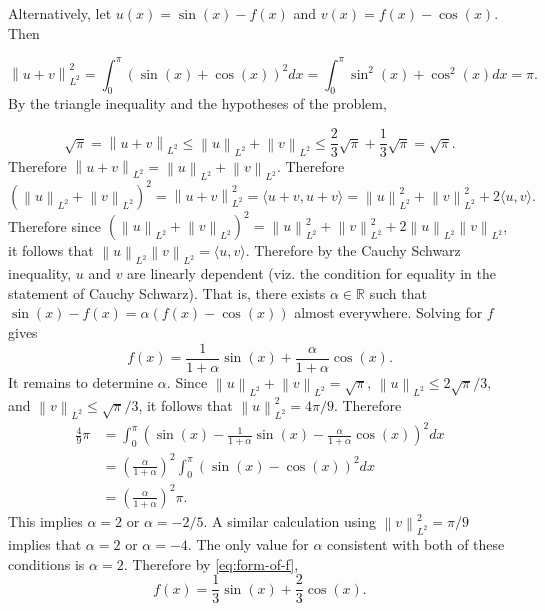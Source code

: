 \documentclass[answers]{exam}
\theoremstyle{problemstyle}
\newcommand{\norm}[1]{\left\lVert#1\right\rVert} %
\newcommand{\1}[1]{\textbf{1}_{\left[#1\right]}} %
\def\R{\mathbb{R}} %
\begin{document}
\begin{questions}
\begin{solution}
    Alternatively, let $u(x)= \sin(x)-f(x)$ and $v(x)=f(x)-\cos(x)$. Then

\begin{equation*}
  \norm{u+v}_{L^{2}}^{2} = \int_{0}^{\pi}\left( \sin(x)+\cos(x) \right)^{2}dx = \int_{0}^{\pi} \sin^{2}(x)+ \cos^{2}(x)dx =\pi.
\end{equation*}
By the triangle inequality and the hypotheses of the problem,

\begin{equation*}
  \sqrt{\pi}=\norm{u+v}_{L^{2}} \leq \norm{u}_{L^{2}} + \norm{v}_{L^{2}} \leq \frac{2}{3}\sqrt{\pi}+ \frac{1}{3}\sqrt{\pi}=\sqrt{\pi}.
\end{equation*}
Therefore
$\norm{u+v}_{L^{2}} = \norm{u}_{L^{2}} + \norm{v}_{L^{2}}$. Therefore
\begin{equation*}
  \left( \norm{u}_{L^{2}}+ \norm{v}_{L^{2}} \right)^{2} = \norm{u+v}_{L^{2}}^{2} = \langle u+v, u+v\rangle = \norm{u}^{2}_{L^{2}}+\norm{v}^{2}_{L^{2}} + 2\langle u,v\rangle.
\end{equation*}
Therefore since $  \left( \norm{u}_{L^{2}}+ \norm{v}_{L^{2}} \right)^{2}= \norm{u}_{L^{2}}^{2}+\norm{v}_{L^{2}}^{2}+2 \norm{u}_{L^{2}}\norm{v}_{L^{2}}$, it follows that $\norm{u}_{L^{2}}\norm{v}_{L^{2}}= \langle u, v \rangle$. Therefore by the Cauchy Schwarz inequality, $u$ and $v$ are linearly dependent (viz. the condition for equality in the statement of Cauchy Schwarz). That is, there exists $\alpha\in \R$ such that $\sin(x)-f(x)= \alpha \left( f(x)-\cos(x) \right)$ almost everywhere. Solving for $f$ gives
\begin{equation}\label{eq:form-of-f}
  f(x) = \frac{1}{1+\alpha}\sin(x)+ \frac{\alpha}{1+\alpha}\cos(x).
\end{equation}
It remains to determine $\alpha$. Since $\norm{u}_{L^{2}}+ \norm{v}_{L^{2}}=\sqrt{\pi}$, $\norm{u}_{L^{2}}\leq 2 \sqrt{\pi}/3$, and $\norm{v}_{L^{2}}\leq \sqrt{\pi}/3$, it follows that $\norm{u}^2_{L^{2}} = 4 \pi/9$. Therefore
\begin{align*}
  \frac{4}{9}\pi &= \int_{0}^{\pi}\left( \sin(x)- \frac{1}{1+\alpha}\sin(x) -\frac{\alpha}{1+\alpha}\cos(x)\right)^{2}dx\\
                 &= \left( \frac{\alpha}{1+\alpha} \right)^{2}\int_{0}^{\pi}\left( \sin(x)-\cos(x) \right)^{2}dx\\
                 &=  \left( \frac{\alpha}{1+\alpha} \right)^{2}\pi.
\end{align*}
This implies $\alpha = 2$ or $\alpha= -2/5$. A similar calculation using $\norm{v}^{2}_{L^{2}}= \pi /9$ implies that $\alpha = 2$ or $\alpha = -4$. The only value for $\alpha$ consistent with both of these conditions is $\alpha =2$. Therefore by \eqref{eq:form-of-f},
\begin{equation*}
  f(x) = \frac{1}{3}\sin(x)+ \frac{2}{3}\cos(x).
\end{equation*}
\end{solution}


\end{questions}
\end{document}
